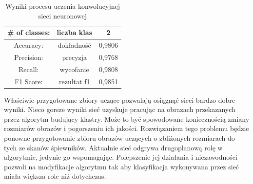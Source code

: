 \documentclass[a4paper,12pt]{article}
\newcommand\spacingInSolemnItemize{1.2}
\begin{document}
                
            \begin{table}[h!]
            \centering
                \begin{tabular}{|c| c| c|} 
                 \hline
                 \# of classes: & liczba klas & 2\\  \hline
                 Accuracy: & dokładność & 0,9806\\ \hline
                 Precision: & precyzja & 0,9768\\ \hline
                 Recall: & wycofanie & 0,9808\\ \hline
                 F1 Score: & rezultat f1 & 0,9851\\ \hline
                \end{tabular}
                \caption{Wyniki procesu uczenia konwolucyjnej sieci neuronowej}
                \label{table:01}
            \end{table}
		    
		    Właściwie przygotowane zbiory uczące pozwalają osiągnąć sieci bardzo dobre wyniki. Nieco gorsze wyniki sieć uzyskuje pracując na obrazach przekazanych przez algorytm budujący klastry. Może to być spowodowane koniecznością zmiany rozmiarów obrazów i pogorszeniu ich jakości. Rozwiązaniem tego problemu będzie ponowne przygotowanie zbioru obrazów uczących o zbliżonych rozmiarach do tych ze skanów śpiewników. Aktualnie sieć odgrywa drugoplanową rolę w algorytmie, jedynie go wspomagając. Polepszenie jej działania i niezawodności pozwoli na modyfikacje algorytmu tak aby klasyfikacja wykonywana przez sieć miała większa role niż dotychczas.
		    
\end{document}
